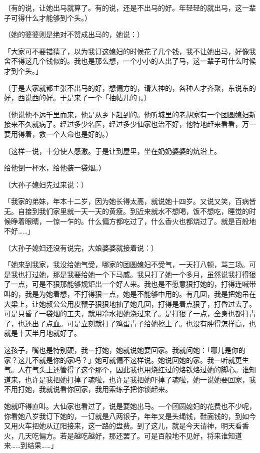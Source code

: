 \documentclass[UTF8]{ctexart}
\begin{document}
（有的说，让她出马就算了。有的说，还是不出马的好。年轻轻的就出马，这一辈子可得什么才能够到个头。）

（她的婆婆则是绝对不赞成出马的，她说：）

「大家可不要错猜了，以为我订这媳妇的时候花了几个钱，我不让她出马，好像我舍不得这几个钱似的。我也是那么想，一个小小的人出了马，这一辈子可什么时候才到个头。」

（于是大家就都主张不出马的好，想偏方的，请大神的，各种人才齐聚，东说东的好，西说西的好。于是来了一个「抽帖儿的」。）

（他说他不远千里而来，他是从乡下赶到的。他听城里的老胡家有一个团圆媳妇新接来不久就病了。经过多少名医，经过多少仙家也治不好，他特地赶来看看，万一要用得着，救一个人命也是好的。）

（这样一说，十分使人感激。于是让到屋里，坐在奶奶婆婆的炕沿上。

给他倒一杯水，给他装一袋烟。）

（大孙子媳妇先过来说：）

「我家的弟妹，年本十二岁，因为她长得太高，就说她十四岁。又说又笑，百病皆无。自接到我们家里就一天一天的黄瘦。到近来就水不想喝，饭不想吃，睡觉的时候睁着眼睛，一惊一乍的。什么偏方都吃过了，什么香火也都烧过了。就是百般地不好……」

（大孙子媳妇还没有说完，大娘婆婆就接着说：）

「她来到我家，我没给她气受，哪家的团圆媳妇不受气，一天打八顿，骂三场。可是我也打过她，那是我要给她一个下马威。我只打了她一个多月，虽然说我打得狠了一点，可是不狠那能够规矩出一个好人来。我也是不愿意狠打她的，打得连喊带叫的，我是为她着想，不打得狠一点，她是不能够中用的。有几回，我是把她吊在大梁上，让她叔公公用皮鞭子狠狠地抽了她几回，打得是着点狠了，打昏过去了。可是只昏了一袋烟的工夫，就用冷水把她浇过来了。是打狠了一点，全身也都打青了，也还出了点血。可是立刻就打了鸡蛋青子给她擦上了。也没有肿得怎样高，也就是十天半月地就好了。

这孩子，嘴也是特别硬，我一打她，她就说她要回家。我就问她：「哪儿是你的家？这儿不就是你的家吗？」她可就偏不这样说。她说回她的家。我一听就更生气。人在气头上还管得了这个那个，因此我也用烧红过的烙铁烙过她的脚心。谁知道来，也许是我把她打掉了魂啦，也许是我把她吓掉了魂啦，她一说她要回家，我不用打她，我就说看你回家，我用索练子把你锁起来。

她就吓得直叫。大仙家也看过了，说是要她出马。一个团圆媳妇的花费也不少呢，你看她八岁我订下她的，一订就是八两银子，年年又是头绳钱，鞋面钱的，到如今又用火车把她从辽阳接来，这一路的盘费。到了这儿，就是今天请神，明天看香火，几天吃偏方。若是越吃越好，那还罢了。可是百般地不见好，将来谁知道来……到结果……」
\end{document}
